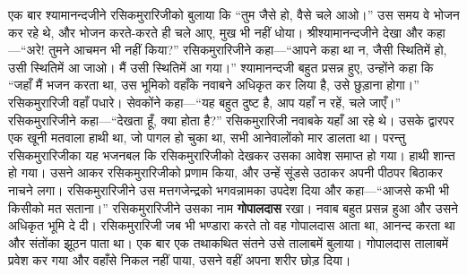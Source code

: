 \begin{sloppypar}\justifying{}
एक बार श्यामानन्दजीने रसिक\-मुरारिजीको बुलाया कि “तुम जैसे हो, वैसे चले आओ।” उस समय वे भोजन कर रहे थे, और भोजन करते-करते ही चले आए, मुख भी नहीं धोया। श्रीश्यामानन्दजीने देखा और कहा—“अरे! तुमने आचमन भी नहीं किया?” रसिक\-मुरारिजीने कहा—“आपने कहा था न, जैसी स्थितिमें हो, उसी स्थितिमें आ जाओ। मैं उसी स्थितिमें आ गया।” श्यामानन्दजी बहुत प्रसन्न हुए, उन्होंने कहा कि “जहाँ मैं भजन करता था, उस भूमिको वहाँके नवाबने अधिकृत कर लिया है, उसे छुड़ाना होगा।” रसिक\-मुरारिजी वहाँ पधारे। सेवकोंने कहा—“यह बहुत दुष्ट है, आप यहाँ न रहें, चले जाएँ।” रसिक\-मुरारिजीने कहा—“देखता हूँ, क्या होता है?” रसिक\-मुरारिजी नवाबके यहाँ आ रहे थे। उसके द्वारपर एक खूनी मतवाला हाथी था, जो पागल हो चुका था, सभी आनेवालोंको मार डालता था। परन्तु रसिक\-मुरारिजीका यह भजन\-बल कि रसिक\-मुरारिजीको देखकर उसका आवेश समाप्त हो गया। हाथी शान्त हो गया। उसने आकर रसिक\-मुरारिजीको प्रणाम किया, और उन्हें सूंडसे उठाकर अपनी पीठपर बिठाकर नाचने लगा। रसिक\-मुरारिजीने उस मत्तगजेन्द्रको भगवन्नामका उपदेश दिया और कहा—“आजसे कभी भी किसीको मत सताना।” रसिक\-मुरारिजीने उसका नाम \textbf{गोपालदास} रखा। नवाब बहुत प्रसन्न हुआ और उसने अधिकृत भूमि दे दी। रसिक\-मुरारिजी जब भी भण्डारा करते तो वह गोपालदास आता था, आनन्द करता था और संतोंका झूठन पाता था। एक बार एक तथाकथित संतने उसे तालाबमें बुलाया। गोपालदास तालाबमें प्रवेश कर गया और वहाँसे निकल नहीं पाया, उसने वहीं अपना शरीर छोड़ दिया।
\end{sloppypar}


